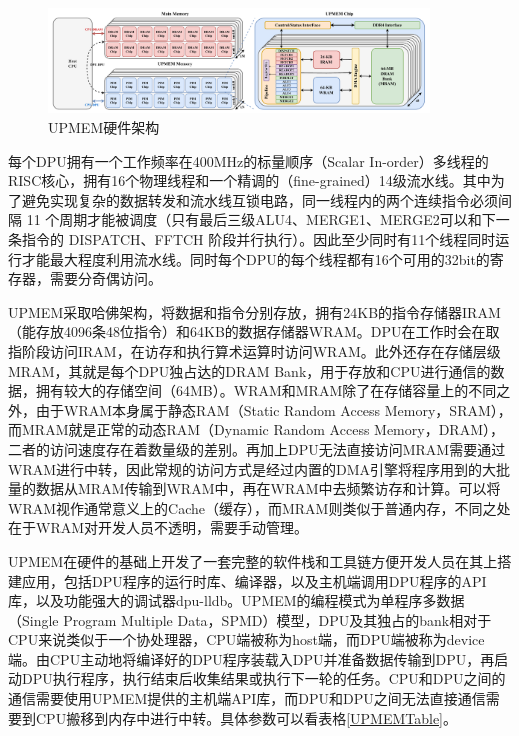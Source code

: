 \begin{figure}[!htbp]
	\centering
    \includegraphics[width=0.9\textwidth]{figures/UPMEMArch.pdf}
    \caption{UPMEM硬件架构}
	\label{UPMEMArch}
\end{figure}

每个DPU拥有一个工作频率在400MHz的标量顺序（Scalar In-order）多线程的RISC核心，拥有16个物理线程和一个精调的（fine-grained）14级流水线。其中为了避免实现复杂的数据转发和流水线互锁电路\cite{UPMEMHotChips}，同一线程内的两个连续指令必须间隔 11 个周期才能被调度（只有最后三级ALU4、MERGE1、MERGE2可以和下一条指令的 DISPATCH、FFTCH 阶段并行执行）。因此至少同时有11个线程同时运行才能最大程度利用流水线。同时每个DPU的每个线程都有16个可用的32bit的寄存器，需要分奇偶访问。

UPMEM采取哈佛架构，将数据和指令分别存放，拥有24KB的指令存储器IRAM（能存放4096条48位指令）和64KB的数据存储器WRAM。DPU在工作时会在取指阶段访问IRAM，在访存和执行算术运算时访问WRAM。此外还存在存储层级MRAM，其就是每个DPU独占达的DRAM Bank，用于存放和CPU进行通信的数据，拥有较大的存储空间（64MB）。WRAM和MRAM除了在存储容量上的不同之外，由于WRAM本身属于静态RAM（Static Random Access Memory，SRAM），而MRAM就是正常的动态RAM（Dynamic Random Access Memory，DRAM），二者的访问速度存在着数量级的差别。再加上DPU无法直接访问MRAM需要通过WRAM进行中转，因此常规的访问方式是经过内置的DMA引擎将程序用到的大批量的数据从MRAM传输到WRAM中，再在WRAM中去频繁访存和计算。可以将WRAM视作通常意义上的Cache（缓存），而MRAM则类似于普通内存，不同之处在于WRAM对开发人员不透明，需要手动管理。

UPMEM在硬件的基础上开发了一套完整的软件栈和工具链方便开发人员在其上搭建应用，包括DPU程序的运行时库、编译器，以及主机端调用DPU程序的API库，以及功能强大的调试器dpu-lldb。UPMEM的编程模式为单程序多数据（Single Program Multiple Data，SPMD）模型，DPU及其独占的bank相对于CPU来说类似于一个协处理器，CPU端被称为host端，而DPU端被称为device端。由CPU主动地将编译好的DPU程序装载入DPU并准备数据传输到DPU，再启动DPU执行程序，执行结束后收集结果或执行下一轮的任务。CPU和DPU之间的通信需要使用UPMEM提供的主机端API库，而DPU和DPU之间无法直接通信需要到CPU搬移到内存中进行中转。具体参数可以看表格\ref{UPMEMTable}。

